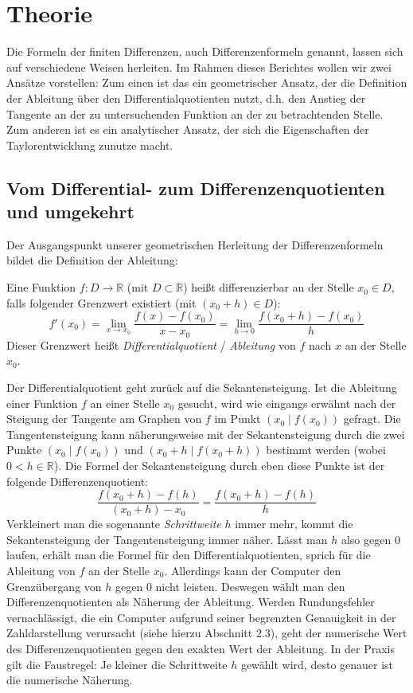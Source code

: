 \documentclass{scrartcl}
\begin{document}
\pagebreak \section{Theorie}
\label{sec:theorie}
Die Formeln der finiten Differenzen, auch Differenzenformeln genannt, lassen sich auf verschiedene Weisen herleiten. Im Rahmen dieses Berichtes wollen wir zwei Ansätze vorstellen: Zum einen ist das ein geometrischer Ansatz, der die Definition der Ableitung über den Differentialquotienten nutzt, d.h. den Anstieg der Tangente an der zu untersuchenden Funktion an der zu betrachtenden Stelle. Zum anderen ist es ein analytischer Ansatz, der sich die Eigenschaften der Taylorentwicklung zunutze macht.

\subsection{Vom Differential- zum Differenzenquotienten und umgekehrt}
\label{ssec:herleitung1}
Der Ausgangspunkt unserer geometrischen Herleitung der Differenzenformeln bildet die Definition der Ableitung:
\begin{shaded}
Eine Funktion $f:D \rightarrow \mathbb{R}$ (mit $D\subset \mathbb{R}$) heißt differenzierbar an der Stelle $x_0 \in D$, falls folgender Grenzwert existiert (mit $(x_0+h) \in D$): \[f'(x_0) = \lim _{x\to x_0} {\frac {f(x)-f(x_0)}{x-x_0}} = \lim _{h\to 0} {\frac {f(x_0+h)-f(x_0)}{h}}\] Dieser Grenzwert heißt \textit{Differentialquotient} / \textit{Ableitung} von $f$ nach $x$ an der Stelle $x_0$.
\end{shaded}
Der Differentialquotient geht zurück auf die Sekantensteigung. Ist die Ableitung einer Funktion $f$ an einer Stelle $x_0$ gesucht, wird wie eingangs erwähnt nach der Steigung der Tangente am Graphen von $f$ im Punkt $(x_0 \mid f(x_0))$ gefragt. Die Tangentensteigung kann näherungsweise mit der Sekantensteigung durch die zwei Punkte $(x_0 \mid f(x_0))$ und $(x_0 + h \mid f(x_0 + h))$ bestimmt werden (wobei $0<h \in \mathbb{R}$). Die Formel der Sekantensteigung durch eben diese Punkte ist der folgende Differenzenquotient: \[\frac {f(x_0 + h)-f(h)}{(x_0 + h) - x_0} = \frac {f(x_0 + h)-f(h)}{h}\]
Verkleinert man die sogenannte \textit{Schrittweite} $h$ immer mehr, kommt die Sekantensteigung der Tangentensteigung immer näher. Lässt man $h$ also gegen $0$ laufen, erhält man die Formel für den Differentialquotienten, sprich für die Ableitung von $f$ an der Stelle $x_0$. Allerdings kann der Computer den Grenzübergang von $h$ gegen $0$ nicht leisten. Deswegen wählt man den Differenzenquotienten als Näherung der Ableitung. Werden Rundungsfehler vernachlässigt, die ein Computer aufgrund seiner begrenzten Genauigkeit in der Zahldarstellung verursacht (siehe hierzu Abschnitt 2.3), geht der numerische Wert des Differenzenquotienten gegen den exakten Wert der Ableitung. In der Praxis gilt die Faustregel: Je kleiner die Schrittweite $h$ gewählt wird, desto genauer ist die numerische Näherung. \\
\end{document}
